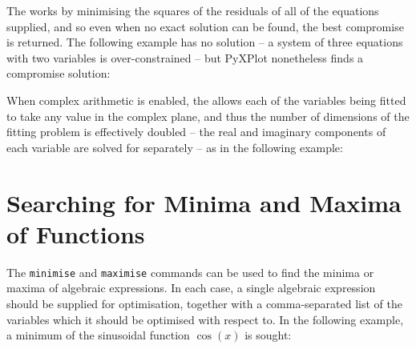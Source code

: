 The  works by minimising the squares of the residuals of all of the
equations supplied, and so even when no exact solution can be found, the best
compromise is returned. The following example has no solution -- a system of
three equations with two variables is over-constrained -- but PyXPlot
nonetheless finds a compromise solution:

\vspace{3mm}
\newline
{}\newline
{}\newline
{}\newline
{}
\vspace{3mm}

When complex arithmetic is enabled, the  allows each of the
variables being fitted to take any value in the complex plane, and thus the
number of dimensions of the fitting problem is effectively doubled -- the real
and imaginary components of each variable are solved for separately -- as in
the following example:

\vspace{3mm}
\newline
{}\newline
{}\newline
{}\newline
{}\newline
{}
\vspace{3mm}

\section{Searching for Minima and Maxima of Functions}

The  {\tt minimise} and {\tt maximise}
commands can be used to find the minima or maxima of algebraic expressions. In
each case, a single algebraic expression should be supplied for optimisation,
together with a comma-separated list of the variables which it should be
optimised with respect to. In the following example, a minimum of the
sinusoidal function $\cos(x)$ is sought:

